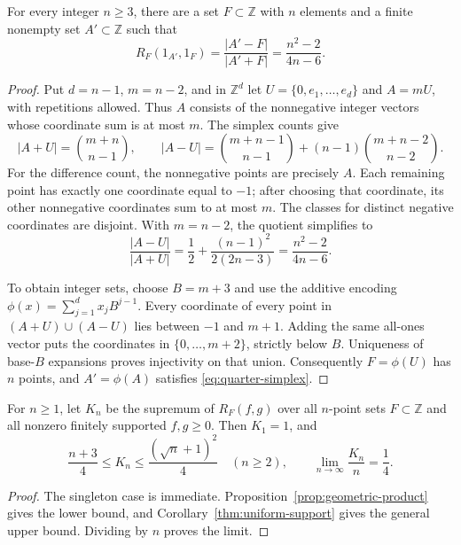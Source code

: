 \begin{proposition}\label{prop:quarter-simplex}
For every integer $n\ge3$, there are a set $F\subset\mathbb Z$ with $n$
elements and a finite nonempty set $A'\subset\mathbb Z$ such that
\begin{equation}\label{eq:quarter-simplex}
 R_F(1_{A'},1_F)=\frac{|A'-F|}{|A'+F|}
               =\frac{n^2-2}{4n-6}.
\end{equation}
\end{proposition}
\begin{proof}
Put $d=n-1$, $m=n-2$, and in $\mathbb Z^d$ let
$U=\{0,e_1,\ldots,e_d\}$ and $A=mU$, with repetitions allowed.
Thus $A$ consists of the nonnegative integer vectors whose coordinate
sum is at most $m$. The simplex counts give
\[
 |A+U|=\binom{m+n}{n-1},\qquad
 |A-U|=\binom{m+n-1}{n-1}
             +(n-1)\binom{m+n-2}{n-2}.
\]
For the difference count, the nonnegative points are precisely $A$.
Each remaining point has exactly one coordinate equal to $-1$; after
choosing that coordinate, its other nonnegative coordinates sum to at
most $m$. The classes for distinct negative coordinates are disjoint.
With $m=n-2$, the quotient simplifies to
\[
 \frac{|A-U|}{|A+U|}
 =\frac12+\frac{(n-1)^2}{2(2n-3)}
 =\frac{n^2-2}{4n-6}.
\]

To obtain integer sets, choose $B=m+3$ and use the additive encoding
$\phi(x)=\sum_{j=1}^d x_jB^{j-1}$. Every coordinate of every point in
$(A+U)\cup(A-U)$ lies between $-1$ and $m+1$. Adding the same all-ones
vector puts the coordinates in $\{0,\ldots,m+2\}$, strictly below $B$.
Uniqueness of base-$B$ expansions proves injectivity on that union.
Consequently $F=\phi(U)$ has $n$ points, and $A'=\phi(A)$ satisfies
\eqref{eq:quarter-simplex}.
\end{proof}

\begin{corollary}\label{cor:quarter-asymptotic}
For $n\ge1$, let $K_n$ be the supremum of $R_F(f,g)$ over all
$n$-point sets $F\subset\mathbb Z$ and all nonzero finitely supported
$f,g\ge0$. Then $K_1=1$, and
\[
 \frac{n+3}{4}\le K_n\le\frac{(\sqrt n+1)^2}{4}\quad(n\ge2),
 \qquad \lim_{n\to\infty}\frac{K_n}{n}=\frac14.
\]
\end{corollary}
\begin{proof}
The singleton case is immediate. Proposition~\ref{prop:geometric-product}
gives the lower bound, and Corollary~\ref{thm:uniform-support} gives
the general upper bound. Dividing by $n$ proves the limit.
\end{proof}

